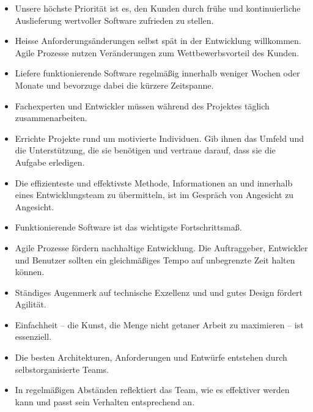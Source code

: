 \begin{itemize}
	\item Unsere höchste Priorität ist es, den Kunden durch frühe und kontinuierliche Auslieferung wertvoller Software zufrieden zu stellen.
	\item Heisse Anforderungsänderungen selbst spät in der Entwicklung willkommen. Agile Prozesse nutzen Veränderungen zum Wettbewerbsvorteil des Kunden.
	\item Liefere funktionierende Software regelmäßig innerhalb weniger Wochen oder Monate und bevorzuge dabei die kürzere Zeitspanne.
	\item Fachexperten und Entwickler müssen während des Projektes täglich zusammenarbeiten.
	\item Errichte Projekte rund um motivierte Individuen. Gib ihnen das Umfeld und die Unterstützung, die sie benötigen und vertraue darauf, dass sie die Aufgabe erledigen.
	\item Die effizienteste und effektivste Methode, Informationen an und innerhalb eines Entwicklungsteam zu übermitteln, ist im Gespräch von Angesicht zu Angesicht.
	\item Funktionierende Software ist das wichtigste Fortschrittsmaß.
	\item Agile Prozesse fördern nachhaltige Entwicklung. Die Auftraggeber, Entwickler und Benutzer sollten ein gleichmäßiges Tempo auf unbegrenzte Zeit halten können.
	\item Ständiges Augenmerk auf technische Exzellenz und und gutes Design fördert Agilität.
	\item Einfachheit -- die Kunst, die Menge nicht getaner Arbeit zu maximieren -- ist essenziell.
	\item Die besten Architekturen, Anforderungen und Entwürfe entstehen durch selbstorganisierte Teams.
	\item In regelmäßigen Abständen reflektiert das Team, wie es effektiver werden kann und passt sein Verhalten entsprechend an.
\end{itemize}